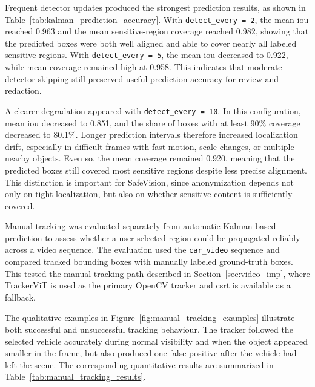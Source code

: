 Frequent detector updates produced the strongest prediction results, as shown in Table~\ref{tab:kalman_prediction_accuracy}. With \texttt{detect\_every = 2}, the mean \acrshort{iou} reached 0.963 and the mean sensitive-region coverage reached 0.982, showing that the predicted boxes were both well aligned and able to cover nearly all labeled sensitive regions. With \texttt{detect\_every = 5}, the mean \acrshort{iou} decreased to 0.922, while mean coverage remained high at 0.958. This indicates that moderate detector skipping still preserved useful prediction accuracy for review and redaction.

A clearer degradation appeared with \texttt{detect\_every = 10}. In this configuration, mean \acrshort{iou} decreased to 0.851, and the share of boxes with at least 90\% coverage decreased to 80.1\%. Longer prediction intervals therefore increased localization drift, especially in difficult frames with fast motion, scale changes, or multiple nearby objects. Even so, the mean coverage remained 0.920, meaning that the predicted boxes still covered most sensitive regions despite less precise alignment. This distinction is important for \gls{SafeVision}, since anonymization depends not only on tight localization, but also on whether sensitive content is sufficiently covered.


Manual tracking was evaluated separately from automatic Kalman-based prediction to assess whether a user-selected region could be propagated reliably across a video sequence. The evaluation used the \texttt{car\_video} sequence and compared tracked \gls{bounding box}es with manually labeled ground-truth boxes. This tested the manual tracking path described in Section~\ref{sec:video_imp}, where TrackerViT is used as the primary OpenCV tracker and \acrshort{csrt} is available as a fallback.

The qualitative examples in Figure~\ref{fig:manual_tracking_examples} illustrate both successful and unsuccessful tracking behaviour. The tracker followed the selected vehicle accurately during normal visibility and when the object appeared smaller in the frame, but also produced one \gls{false positive} after the vehicle had left the scene. The corresponding quantitative results are summarized in Table~\ref{tab:manual_tracking_results}.

